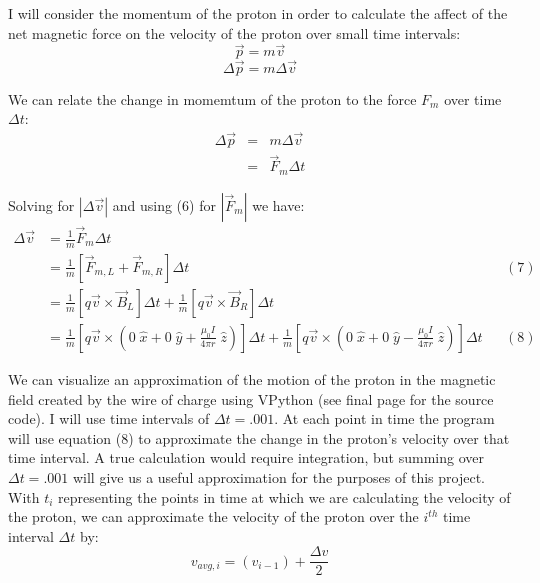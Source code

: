 \documentclass[11pt]{article}
\begin{document}
\vspace{.2in}

\noindent I will consider the momentum of the proton in order to calculate the affect of the net magnetic force on the velocity of the proton over small time intervals:
\[
\vec{p}=m\vec{v}
\] 
\[
\Delta\vec{p}=m\Delta\vec{v}
\]

\vspace{.2in}

\noindent We can relate the change in momemtum of the proton to the force $F_m$ over time $\Delta t$:
\begin{eqnarray*}
\Delta\vec{p}&=&m\Delta\vec{v}\\&=&\vec{F}_m\Delta t
\end{eqnarray*}

\vspace{.2in}

\noindent Solving for $\left|\Delta\vec{v}\right|$ and using (6) for $\left|\vec{F}_m\right|$ we have:
\begin{align*}
\Delta\vec{v}&=\frac{1}{m}\vec{F}_m\Delta t\\&=\frac{1}{m}\left[\vec{F}_{m,L}+\vec{F}_{m,R}\right]\Delta t&&(7)\\&=\frac{1}{m}\left[q\vec{v}\times\vec{B}_L\right]\Delta t + \frac{1}{m}\left[q\vec{v}\times\vec{B}_R\right]\Delta t\\&=\frac{1}{m}\left[q\vec{v}\times\left(0\;\hat{x}+0\;\hat{y}+\frac{\mu_0I}{4\pi r}\;\hat{z}\right)\right]\Delta t + \frac{1}{m}\left[q\vec{v}\times\left(0\;\hat{x}+0\;\hat{y}-\frac{\mu_0I}{4\pi r}\;\hat{z}\right)\right]\Delta t&&(8)
\end{align*} 

\vspace{.2in}

\noindent We can visualize an approximation of the motion of the proton in the magnetic field created by the wire of charge using VPython (see final page for the source code). I will use time intervals of $\Delta t=.001$. At each point in time the program will use equation (8) to approximate the change in the proton's velocity over that time interval. A true calculation would require integration, but summing over $\Delta t=.001$ will give us a useful approximation for the purposes of this project. With $t_i$ representing the points in time at which we are calculating the velocity of the proton, we can approximate the velocity of the proton over the $i^{th}$ time interval $\Delta t$ by:
\[
v_{avg,i}=\left(v_{i-1}\right)+\frac{\Delta v}{2}
\]
\end{document}
